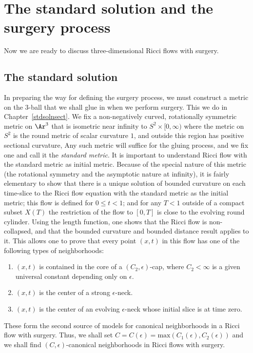 \section{The standard solution and the surgery process}

Now we are ready to discuss three-dimensional Ricci flows with surgery.

\subsection{The standard solution}

In preparing the way for defining the surgery process, we must
construct a metric on the $3$-ball that we shall glue in when we
perform surgery. This we do in Chapter~\ref{stdsolnsect}. We fix a
non-negatively curved, rotationally symmetric metric on $\Ar^3$ that
is isometric near infinity to $S^2\times [0,\infty)$ where the
metric on $S^2$ is the round metric of scalar curvature $1$, and
outside this region has positive sectional curvature,  Any such metric will suffice for the gluing
process, and we fix one and call it the {\em standard
metric}. It is important to understand Ricci flow
with the standard metric as initial metric.  Because of the special
nature of this metric (the rotational symmetry and the asymptotic
nature at infinity), it is fairly elementary to show that there is a
unique solution of bounded curvature on each time-slice to the Ricci
flow equation with the standard metric as the initial metric; this
flow is defined for $0\le t<1$; and for any $T<1$ outside of a
compact subset $X(T)$ the restriction of the flow to $[0,T]$ is
close to the evolving round cylinder. Using the length function, one
shows that the Ricci flow is non-collapsed, and that the bounded
curvature and bounded distance result applies to it.
 This allows one to prove that every point $(x,t)$ in this flow has one of the
following types of neighborhoods:
\begin{enumerate}
\item $(x,t)$ is contained in the core of a $(C_2,\epsilon)$-cap,
where $C_2<\infty$ is a given universal constant depending only on $\epsilon$.
\item $(x,t)$ is the center of a strong $\epsilon$-neck.
\item $(x,t)$ is the center of an evolving $\epsilon$-neck whose
initial slice is at time zero.
\end{enumerate}

These form the second source of models for canonical neighborhoods in a Ricci
flow with surgery. Thus, we shall set $C=C(\epsilon)=\mathrm{max}(C_1(\epsilon),C_2(\epsilon))$ and we shall find $(C,\epsilon)$-canonical
neighborhoods in Ricci flows with surgery.







